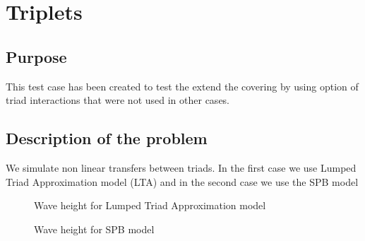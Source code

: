\chapter{Triplets}
%
%
\section{Purpose}
%
This test case has been created to test the extend the covering by using option of triad interactions that were not used in other cases.

%
\section{Description of the problem}
We simulate non linear transfers between triads. In the first case we use Lumped Triad Approximation model (LTA) and in the second case we use the SPB model
\begin{figure} [!h]
\centering
{}
 \caption{Wave height for Lumped Triad Approximation model}
\label{figrestripl}
\end{figure}
\begin{figure} [!h]
\centering
{}
 \caption{Wave height for SPB model}
\label{figrestripl2}
\end{figure}
